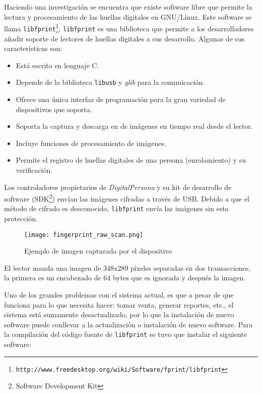 Haciendo una investigación se encuentra que existe software libre que permite la lectura y procesamiento de las huellas digitales en GNU/Linux. Este software se llama \texttt{libfprint\footnote{http://www.freedesktop.org/wiki/Software/fprint/libfprint}}.  \texttt{libfprint} es una biblioteca que permite a los desarrolladores añadir soporte de lectores de huellas digitales a sus desarrollo. Algunas de sus características son:

\begin{itemize}
 \item Está escrito en lenguaje C.
 \item Depende de la biblioteca \texttt{libusb} y \textit{glib} para la comunicación.
 \item Ofrece una única interfaz de programación para la gran variedad de dispositivos que soporta.
 \item Soporta la captura y descarga en de imágenes en tiempo real desde el lector.
 \item Incluye funciones de procesamiento de imágenes.
 \item Permite el registro de huellas digitales de una persona (enrolamiento) y su verificación.
\end{itemize}

Los controladores propietarios de \textit{DigitalPersona} y su kit de desarrollo de software (SDK\footnote{Software Development Kit}) envían las imágenes cifradas a través de USB. Debido a que el método de cifrado es desconocido,  \texttt{libfprint} envía las imágenes sin esta protección.

\begin{figure}[htb]
 \begin{center}
  \texttt{[image: fingerprint\_raw\_scan.png]}
 \end{center}
 \caption{Ejemplo de imagen capturada por el dispositivo}
 \label{fig:finger_print_3}
\end{figure}

El lector manda una imagen de 348x289 píxeles separadas en dos transacciones, la primera es un encabezado de 64 bytes que es ignorada y después la imagen.

Uno de los grandes problemas con el sistema actual, es que a pesar de que funciona para lo que necesita hacer: tomar venta, generar reportes, etc., el sistema está sumamente desactualizado, por lo que la instalación de nuevo software puede conllevar a la actualización o instalación de nuevo software. Para la compilación del código fuente de \texttt{libfprint} se tuvo que instalar el siguiente software:

